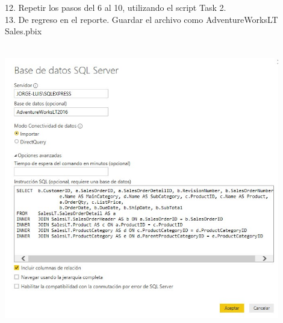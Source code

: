 \documentclass[12pt,letterpaper]{article}
\begin{document}
\begin{flushleft}
\begin{itemize}
\begin{center}
	\end{center}
\textbf{ }\\
\textbf{ }\\
\textbf{ }\\
\textbf{ }\\
\textbf{ }\\
\textbf{ }\\
\textbf{ }\\
\textbf{ }\\
\textbf{ }\\
\textbf{ }\\
\textbf{ }\\
\textbf{ }\\
\textbf{ }\\
\textbf{ }\\
\textbf{ }\\
\textbf{ }\\
\textbf{ }\\
\textbf{ }\\
\textbf{ }\\
\textbf{ }\\
\textbf{ }\\
\textbf{ }\\
\textbf{ }\\
\textbf{ }\\
12. Repetir los pasos del 6 al 10, utilizando el script Task 2.\\
13. De regreso en el reporte. Guardar el archivo como AdventureWorksLT Sales.pbix\\
\textbf{ }\\
\begin{center}
	\includegraphics[width=12cm]{./Imagenes/image6} 

\end{center}
\end{itemize}
\end{flushleft}
\end{document}
